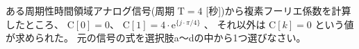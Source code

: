 ある周期性時間領域アナログ信号(周期 $\textrm{T} = 4$ [秒])から複素フーリエ係数を計算したところ、
$\textrm{C}[0] = 0$、
$\textrm{C}[1] = 4 \cdot \textrm{e}^{\{j \cdot \pi/4 \}}$ 、
それ以外は $\textrm{C}[k] = 0$ という値が求められた。
元の信号の式を選択肢a〜dの中から1つ選びなさい。
